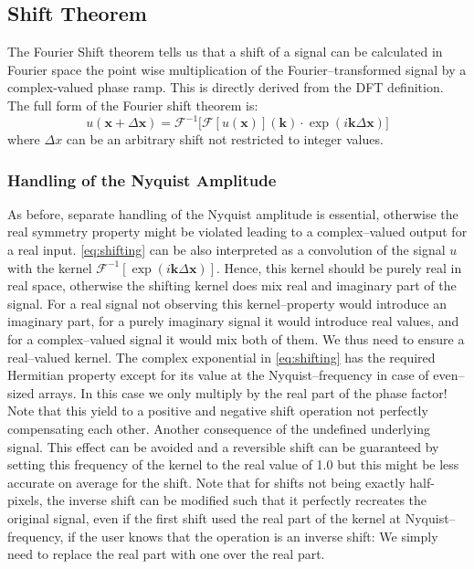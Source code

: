 \documentclass{juliacon}
\begin{document}
    \subsection{Shift Theorem}
        The Fourier Shift theorem tells us that a shift of a signal can be calculated 
        in Fourier space the point wise multiplication of the Fourier--transformed signal by a complex-valued phase ramp.
        This is directly derived from the DFT definition.
        The full form of the Fourier shift theorem is:
        \begin{equation}
            u(\mathbf x+ \Delta \mathbf x) = \mathcal{F}^{-1}\big[\mathcal{F}[u(\mathbf x)](\mathbf k) \cdot \exp(i \mathbf k \Delta \mathbf x) \big]
            \label{eq:shifting}
        \end{equation}
        where $\Delta x$ can be an arbitrary shift not restricted to integer values.
        \subsubsection{Handling of the Nyquist Amplitude}
            As before, separate handling of the Nyquist amplitude is essential, otherwise 
            the real symmetry property might be violated leading to a complex--valued output for a real input.
            \autoref{eq:shifting} can be also interpreted as a convolution of the signal $u$
            with the kernel $\mathcal{F}^{-1}\left[\exp(i \mathbf k \Delta \mathbf x)\right]$.            
            Hence, this kernel should be purely real in real space, otherwise the
            shifting kernel does mix real and imaginary part of the signal.
            For a real signal not observing this kernel--property would introduce an imaginary part, for a purely imaginary signal it would introduce real values, and for a complex--valued signal it would mix both of them. We thus need to ensure a real--valued kernel. The complex exponential in \autoref{eq:shifting} has the required Hermitian property except for its value at the Nyquist--frequency in case of even--sized arrays. In this case we only multiply by the real part of the phase factor! Note that this yield to a positive and negative shift operation not perfectly compensating each other. Another consequence of the undefined underlying signal. This effect can be avoided and a reversible shift can be guaranteed by setting this frequency of the kernel to the real value of 1.0 but this might be less accurate on average for the shift. Note that for shifts not being exactly half-pixels, the inverse shift can be modified such that it perfectly recreates the original signal, even if the first shift used the real part of the kernel at Nyquist--frequency, if the user knows that the operation is an inverse shift: We simply need to replace the real part with one over the real part. 
            
\end{document}
